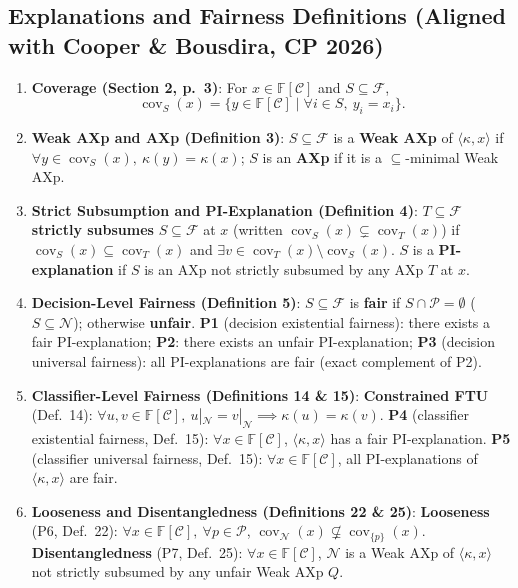 \documentclass[11pt,a4paper]{article}
\newcommand{\F}{\mathbb{F}}
\newcommand{\C}{\mathcal{C}}
\newcommand{\N}{\mathcal{N}}
\newcommand{\Prot}{\mathcal{P}}
\newcommand{\cov}{\operatorname{cov}}
\begin{document}
\subsection{Explanations and Fairness Definitions (Aligned with Cooper \& Bousdira, CP 2026)}
\begin{enumerate}
  \item \textbf{Coverage (Section 2, p.~3)}: For $x \in \F[\C]$ and $S \subseteq \mathcal{F}$,
  \[
    \cov_S(x) = \{y \in \F[\C] \mid \forall i \in S,\ y_i = x_i\}.
  \]
  \item \textbf{Weak AXp and AXp (Definition 3)}:
  $S \subseteq \mathcal{F}$ is a \textbf{Weak AXp} of $\langle \kappa, x \rangle$ if $\forall y \in \cov_S(x),\ \kappa(y) = \kappa(x)$; $S$ is an \textbf{AXp} if it is a $\subseteq$-minimal Weak AXp.
  \item \textbf{Strict Subsumption and PI-Explanation (Definition 4)}:
  $T \subseteq \mathcal{F}$ \textbf{strictly subsumes} $S \subseteq \mathcal{F}$ at $x$ (written $\cov_S(x) \subsetneq \cov_T(x)$) if $\cov_S(x) \subseteq \cov_T(x)$ and $\exists v \in \cov_T(x) \setminus \cov_S(x)$. $S$ is a \textbf{PI-explanation} if $S$ is an AXp not strictly subsumed by any AXp $T$ at $x$.
  \item \textbf{Decision-Level Fairness (Definition 5)}:
  $S \subseteq \mathcal{F}$ is \textbf{fair} if $S \cap \Prot = \emptyset$ ($S \subseteq \N$); otherwise \textbf{unfair}. \textbf{P1} (decision existential fairness): there exists a fair PI-explanation; \textbf{P2}: there exists an unfair PI-explanation; \textbf{P3} (decision universal fairness): all PI-explanations are fair (exact complement of P2).
  \item \textbf{Classifier-Level Fairness (Definitions 14 \& 15)}:
  \textbf{Constrained FTU} (Def.~14): $\forall u, v \in \F[\C],\ u|_{\N} = v|_{\N} \implies \kappa(u) = \kappa(v)$. \textbf{P4} (classifier existential fairness, Def.~15): $\forall x \in \F[\C]$, $\langle \kappa, x \rangle$ has a fair PI-explanation. \textbf{P5} (classifier universal fairness, Def.~15): $\forall x \in \F[\C]$, all PI-explanations of $\langle \kappa, x \rangle$ are fair.
  \item \textbf{Looseness and Disentangledness (Definitions 22 \& 25)}:
  \textbf{Looseness} (P6, Def.~22): $\forall x \in \F[\C],\ \forall p \in \Prot$, $\cov_{\N}(x) \not\subsetneq \cov_{\{p\}}(x)$. \textbf{Disentangledness} (P7, Def.~25): $\forall x \in \F[\C]$, $\N$ is a Weak AXp of $\langle \kappa, x \rangle$ not strictly subsumed by any unfair Weak AXp $Q$.
\end{enumerate}
\end{document}
